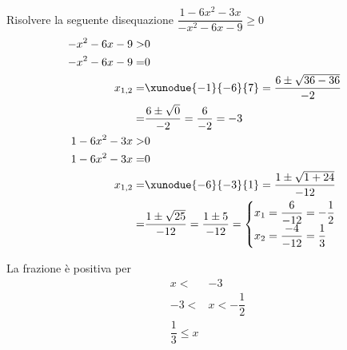 	Risolvere la seguente disequazione $\dfrac{1-6x^2-3x}{-x^2-6x-9}\geq 0$
	\begin{align*}
	-x^2-6x-9>&0\\
	-x^2-6x-9=&0\\
	x_{1,2}=&\xunodue{-1}{-6}{7}=\dfrac{6\pm\sqrt{36-36}}{-2}\\
	=&\dfrac{6\pm\sqrt{0}}{-2}=\dfrac{6}{-2}=-3\\
	1-6x^2-3x>&0\\
	1-6x^2-3x=&0\\
	x_{1,2}=&\xunodue{-6}{-3}{1}=\dfrac{1\pm\sqrt{1+24}}{-12}\\
	=&\dfrac{1\pm\sqrt{25}}{-12}=\dfrac{1\pm 5}{-12}=\begin{cases}
	x_1=\dfrac{6}{-12}=-\dfrac{1}{2}\\
	x_2=\dfrac{-4}{-12}=\dfrac{1}{3}
	\end{cases}\\
	\end{align*}
	\begin{center}
		
	\end{center}
La frazione è positiva per
	\begin{align*}
	x<&-3\\ -3<&x<-\dfrac{1}{2}\\ \dfrac{1}{3}\leq x\\
	\end{align*}
